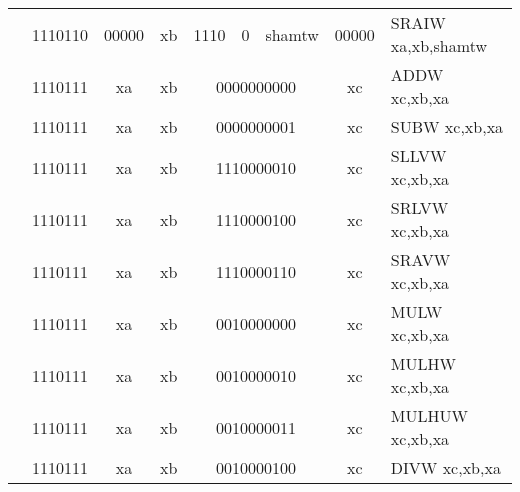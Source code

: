 \begin{table}[p]
\begin{small}
\begin{center}
\begin{tabular}{rcccccccccl}
&
\multicolumn{2}{|c|}{1110110} &
\multicolumn{1}{c|}{00000} &
\multicolumn{1}{c|}{xb} &
\multicolumn{2}{c|}{1110} &
\multicolumn{1}{c|}{0} &
\multicolumn{1}{c|}{shamtw} &
\multicolumn{1}{c|}{00000} & SRAIW xa,xb,shamtw \\
\cline{2-10}
  

&
\multicolumn{2}{|c|}{1110111} &
\multicolumn{1}{c|}{xa} &
\multicolumn{1}{c|}{xb} &
\multicolumn{4}{c|}{0000000000} &
\multicolumn{1}{c|}{xc} & ADDW xc,xb,xa \\
\cline{2-10}
  

&
\multicolumn{2}{|c|}{1110111} &
\multicolumn{1}{c|}{xa} &
\multicolumn{1}{c|}{xb} &
\multicolumn{4}{c|}{0000000001} &
\multicolumn{1}{c|}{xc} & SUBW xc,xb,xa \\
\cline{2-10}
  

&
\multicolumn{2}{|c|}{1110111} &
\multicolumn{1}{c|}{xa} &
\multicolumn{1}{c|}{xb} &
\multicolumn{4}{c|}{1110000010} &
\multicolumn{1}{c|}{xc} & SLLVW xc,xb,xa \\
\cline{2-10}
  

&
\multicolumn{2}{|c|}{1110111} &
\multicolumn{1}{c|}{xa} &
\multicolumn{1}{c|}{xb} &
\multicolumn{4}{c|}{1110000100} &
\multicolumn{1}{c|}{xc} & SRLVW xc,xb,xa \\
\cline{2-10}
  

&
\multicolumn{2}{|c|}{1110111} &
\multicolumn{1}{c|}{xa} &
\multicolumn{1}{c|}{xb} &
\multicolumn{4}{c|}{1110000110} &
\multicolumn{1}{c|}{xc} & SRAVW xc,xb,xa \\
\cline{2-10}
  

&
\multicolumn{2}{|c|}{1110111} &
\multicolumn{1}{c|}{xa} &
\multicolumn{1}{c|}{xb} &
\multicolumn{4}{c|}{0010000000} &
\multicolumn{1}{c|}{xc} & MULW xc,xb,xa \\
\cline{2-10}
  

&
\multicolumn{2}{|c|}{1110111} &
\multicolumn{1}{c|}{xa} &
\multicolumn{1}{c|}{xb} &
\multicolumn{4}{c|}{0010000010} &
\multicolumn{1}{c|}{xc} & MULHW xc,xb,xa \\
\cline{2-10}
  

&
\multicolumn{2}{|c|}{1110111} &
\multicolumn{1}{c|}{xa} &
\multicolumn{1}{c|}{xb} &
\multicolumn{4}{c|}{0010000011} &
\multicolumn{1}{c|}{xc} & MULHUW xc,xb,xa \\
\cline{2-10}
  

&
\multicolumn{2}{|c|}{1110111} &
\multicolumn{1}{c|}{xa} &
\multicolumn{1}{c|}{xb} &
\multicolumn{4}{c|}{0010000100} &
\multicolumn{1}{c|}{xc} & DIVW xc,xb,xa \\
\cline{2-10}
  


\end{tabular}
\end{center}
\end{small}
\end{table}
